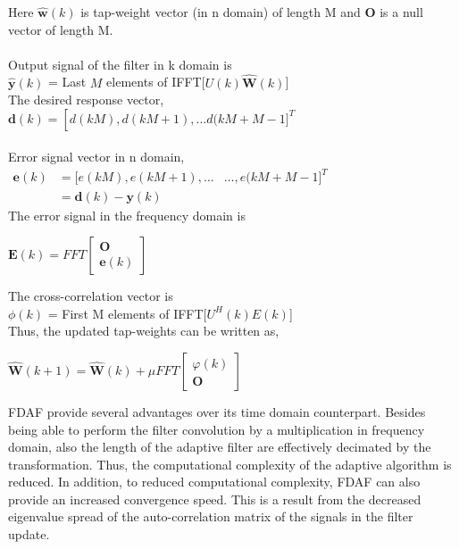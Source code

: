 \documentclass[conference]{IEEEtran}
\begin{document}
Here $\hat{\mathbf{w}}(k)$ is tap-weight vector (in n domain) of length M
and \textbf{O} is a null vector of length M. \\ \\
Output signal of the filter in k domain is \\
$\hat{\mathbf{y}}(k)$ = Last $M$ elements of IFFT[$U(k)\hat{\mathbf{W}}(k)$]\\
The desired response vector,\\
$\mathbf{d}(k)=\left[d(k M), d(k M+1), \ldots d(k M+M-1]^{T}\right.$ \\ \\
Error signal vector in n domain,\\
$\begin{aligned} \mathbf{e}(k) &=[e(k M), e(k M+1), \ldots& \ldots, e(k M+M-1]^{T} \\ &=\mathbf{d}(k)-\mathbf{y}(k) \end{aligned}$ \\
The error signal in the frequency domain is
\begin{center}
$\mathbf{E}(k)=F F T \left[ \begin{array}{l}{\mathbf{O}} \\ {\mathbf{e}(k)}\end{array}\right]$
 \end{center} 
The cross-correlation vector is\\
$\phi(k)$ = First M elements of IFFT[$U^H(k)E(k)$]\\
Thus, the updated tap-weights can be written as, 
\begin{center}
$\hat{\mathbf{W}}(k+1)=\hat{\mathbf{W}}(k)+\mu F F T \left[ \begin{array}{c}{\varphi(k)} \\ {\mathbf{O}}\end{array}\right]$
\end{center}

FDAF provide several advantages over its time domain counterpart. Besides being able to perform the filter convolution by a multiplication in frequency domain, also the length of the adaptive filter are effectively decimated by the transformation. Thus, the computational complexity of the adaptive algorithm is reduced. In addition, to reduced computational complexity, FDAF can also provide an increased convergence speed. This is a result from the decreased eigenvalue spread of the auto-correlation matrix of the signals in the filter update.\\
\end{document}
